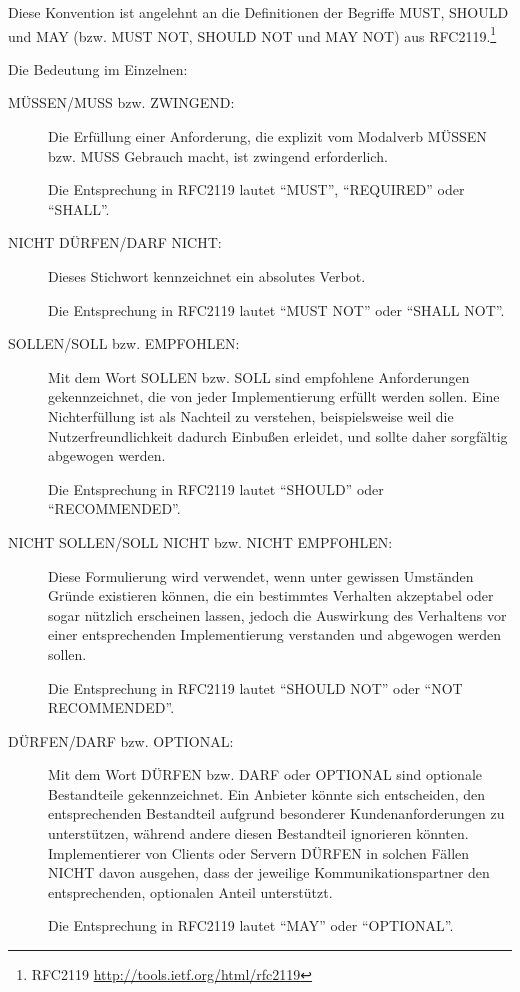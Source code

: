 \documentclass[,a4paper]{article}
\begin{document}
Diese Konvention ist angelehnt an die Definitionen der Begriffe MUST,
SHOULD und MAY (bzw. MUST NOT, SHOULD NOT und MAY NOT) aus
RFC2119.\footnote{RFC2119 \url{http://tools.ietf.org/html/rfc2119}}

Die Bedeutung im Einzelnen:

\begin{description}
\item[MÜSSEN/MUSS bzw. ZWINGEND:]
Die Erfüllung einer Anforderung, die explizit vom Modalverb MÜSSEN bzw.
MUSS Gebrauch macht, ist zwingend erforderlich.

Die Entsprechung in RFC2119 lautet ``MUST'', ``REQUIRED'' oder
``SHALL''.
\item[NICHT DÜRFEN/DARF NICHT:]
Dieses Stichwort kennzeichnet ein absolutes Verbot.

Die Entsprechung in RFC2119 lautet ``MUST NOT'' oder ``SHALL NOT''.
\item[SOLLEN/SOLL bzw. EMPFOHLEN:]
Mit dem Wort SOLLEN bzw. SOLL sind empfohlene Anforderungen
gekennzeichnet, die von jeder Implementierung erfüllt werden sollen.
Eine Nichterfüllung ist als Nachteil zu verstehen, beispielsweise weil
die Nutzerfreundlichkeit dadurch Einbußen erleidet, und sollte daher
sorgfältig abgewogen werden.

Die Entsprechung in RFC2119 lautet ``SHOULD'' oder ``RECOMMENDED''.
\item[NICHT SOLLEN/SOLL NICHT bzw. NICHT EMPFOHLEN:]
Diese Formulierung wird verwendet, wenn unter gewissen Umständen Gründe
existieren können, die ein bestimmtes Verhalten akzeptabel oder sogar
nützlich erscheinen lassen, jedoch die Auswirkung des Verhaltens vor
einer entsprechenden Implementierung verstanden und abgewogen werden
sollen.

Die Entsprechung in RFC2119 lautet ``SHOULD NOT'' oder ``NOT
RECOMMENDED''.
\item[DÜRFEN/DARF bzw. OPTIONAL:]
Mit dem Wort DÜRFEN bzw. DARF oder OPTIONAL sind optionale Bestandteile
gekennzeichnet. Ein Anbieter könnte sich entscheiden, den entsprechenden
Bestandteil aufgrund besonderer Kundenanforderungen zu unterstützen,
während andere diesen Bestandteil ignorieren könnten. Implementierer von
Clients oder Servern DÜRFEN in solchen Fällen NICHT davon ausgehen, dass
der jeweilige Kommunikationspartner den entsprechenden, optionalen
Anteil unterstützt.

Die Entsprechung in RFC2119 lautet ``MAY'' oder ``OPTIONAL''.
\end{description}
\end{document}
